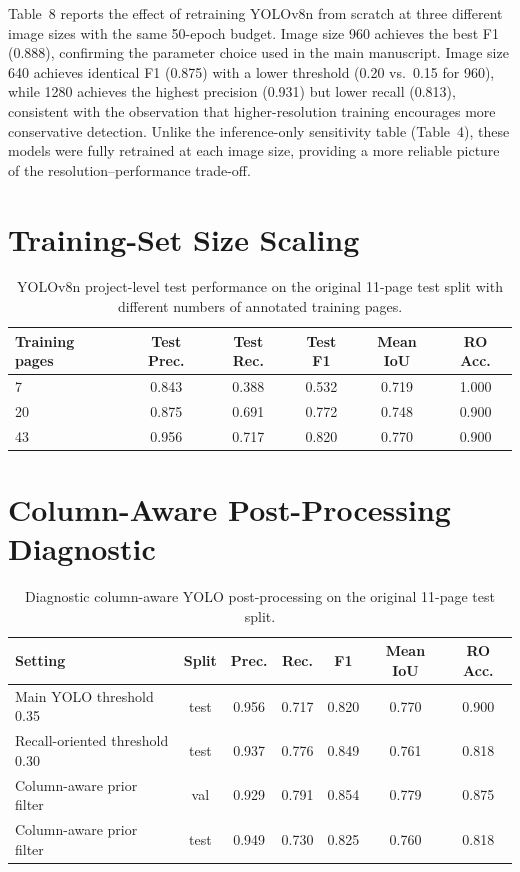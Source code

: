 \documentclass[pdflatex,sn-mathphys-num]{sn-jnl}
\begin{document}
Table~8 reports the effect of retraining YOLOv8n from scratch at three different image sizes with the same 50-epoch budget. Image size 960 achieves the best F1 (0.888), confirming the parameter choice used in the main manuscript. Image size 640 achieves identical F1 (0.875) with a lower threshold (0.20 vs.\ 0.15 for 960), while 1280 achieves the highest precision (0.931) but lower recall (0.813), consistent with the observation that higher-resolution training encourages more conservative detection. Unlike the inference-only sensitivity table (Table~4), these models were fully retrained at each image size, providing a more reliable picture of the resolution--performance trade-off.

\section{Training-Set Size Scaling}

\begin{table}[t]
\centering
\scriptsize\setlength{\tabcolsep}{3pt}
\caption{YOLOv8n project-level test performance on the original 11-page test split with different numbers of annotated training pages.}
\begin{tabular}{lccccc}
\toprule
Training pages & Test Prec. & Test Rec. & Test F1 & Mean IoU & RO Acc. \\
\midrule
7 & 0.843 & 0.388 & 0.532 & 0.719 & 1.000 \\
20 & 0.875 & 0.691 & 0.772 & 0.748 & 0.900 \\
43 & 0.956 & 0.717 & 0.820 & 0.770 & 0.900 \\
\bottomrule
\end{tabular}
\end{table}

\section{Column-Aware Post-Processing Diagnostic}

\begin{table}[t]
\centering
\scriptsize\setlength{\tabcolsep}{3pt}
\caption{Diagnostic column-aware YOLO post-processing on the original 11-page test split.}
\begin{tabular}{lcccccc}
\toprule
Setting & Split & Prec. & Rec. & F1 & Mean IoU & RO Acc. \\
\midrule
Main YOLO threshold 0.35 & test & 0.956 & 0.717 & 0.820 & 0.770 & 0.900 \\
Recall-oriented threshold 0.30 & test & 0.937 & 0.776 & 0.849 & 0.761 & 0.818 \\
Column-aware prior filter & val & 0.929 & 0.791 & 0.854 & 0.779 & 0.875 \\
Column-aware prior filter & test & 0.949 & 0.730 & 0.825 & 0.760 & 0.818 \\
\bottomrule
\end{tabular}
\end{table}
\end{document}
